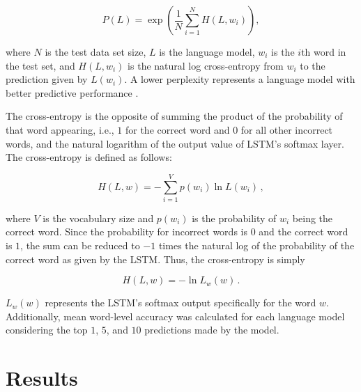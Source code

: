 \documentclass[runningheads,a4paper]{llncs}
\begin{document}
\begin{equation}
\label{perplexity}
    P(L) = \exp\left(\frac{1}{N}\sum^{N}_{i=1} H(L,w_i)\right) ,
\end{equation}

where $N$ is the test data set size, $L$ is the language model, $w_i$
is the $i$th word in the test set, and $H(L, w_i)$ is the natural log
cross-entropy from $w_i$ to the prediction given by $L(w_i)$. A lower
perplexity represents a language model with better predictive
performance \cite{wang2016parallel}.

The cross-entropy is the opposite of summing the
product of the probability of that word appearing, i.e., $1$ for the
correct word and $0$ for all other incorrect words, and the
natural logarithm of the output value of LSTM's softmax layer.
The cross-entropy is defined as follows:

\begin{equation}
\label{cross-entropy}
    H(L,w) = - \sum_{i=1}^V p(w_i) \ln L(w_i) \, ,
\end{equation}

where $V$ is the vocabulary size and $p(w_i)$ is the probability of
$w_i$ being the correct word. Since the probability for incorrect
words is $0$ and the correct word is $1$, the sum can be reduced to
$-1$ times the natural log of the probability of the correct word
as given by the LSTM.
Thus, the cross-entropy is simply

\begin{equation}
\label{simple-cross-entropy}
    H(L,w) = - \ln L_w(w) \, .
\end{equation}

$L_w(w)$ represents the LSTM's softmax output specifically for the
word $w$. Additionally, mean word-level accuracy was calculated for
each language model considering the top $1$, $5$, and $10$ predictions
made by the model.

\section{Results}
\end{document}
